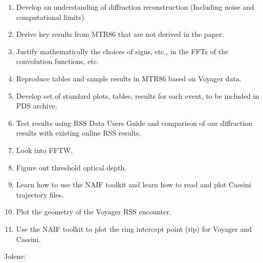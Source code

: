 \documentclass[crop=false,class=article,oneside]{standalone}
\begin{document}
            \begin{enumerate}
                \item Develop an understanding of diffraction
                      reconstruction (Including noise
                      and computational limits).
                \item Derive key results from MTR86 that are not
                      derived in the paper.
                \item Justify mathematically the choices of signs, etc.,
                      in the FFTs of the convolution functions, etc.
                \item Reproduce tables and sample results in MTR86
                      based on Voyager data.
                \item Develop set of standard plots, tables, results
                      for each event, to be included in PDS archive.
                \item Test results using RSS Data Users Guide and
                      comparison of our diffraction results with
                      existing online RSS results.
                \item Look into FFTW.
                \item Figure out threshold optical depth.
                \item Learn how to use the NAIF toolkit and learn
                      how to read and plot Cassini trajectory files.
                \item Plot the geometry of the Voyager RSS encounter.
                \item Use the NAIF toolkit to plot the ring
                      intercept point (rip) for Voyager and Cassini.
            \end{enumerate}
            Jolene:
\end{document}
